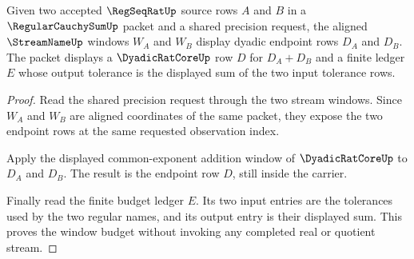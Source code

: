 \begin{theorem}
\label{thm:regular-cauchy-sum-window-budget}
Given two accepted $\RegSeqRatUp$ source rows $A$ and $B$ in a $\RegularCauchySumUp$ packet and a shared precision request, the aligned $\StreamNameUp$ windows $W_A$ and $W_B$ display dyadic endpoint rows $D_A$ and $D_B$. The packet displays a $\DyadicRatCoreUp$ row $D$ for $D_A+D_B$ and a finite ledger $E$ whose output tolerance is the displayed sum of the two input tolerance rows.
\end{theorem}
\begin{proof}
Read the shared precision request through the two stream windows. Since $W_A$ and $W_B$ are aligned coordinates of the same packet, they expose the two endpoint rows at the same requested observation index.

Apply the displayed common-exponent addition window of $\DyadicRatCoreUp$ to $D_A$ and $D_B$. The result is the endpoint row $D$, still inside the carrier.

Finally read the finite budget ledger $E$. Its two input entries are the tolerances used by the two regular names, and its output entry is their displayed sum. This proves the window budget without invoking any completed real or quotient stream.
\end{proof}

